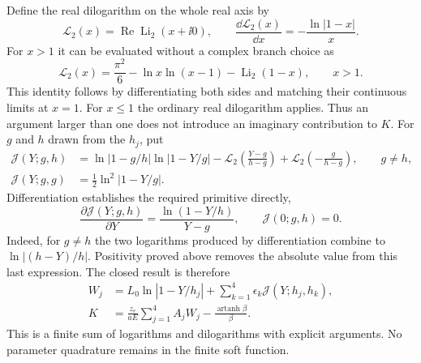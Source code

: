 Define the real dilogarithm on the whole real axis by
\begin{equation}
 \mathcal L_2(x)=\operatorname{Re}\operatorname{Li}_2(x+\ii0),
 \qquad
 \frac{\dd\mathcal L_2(x)}{\dd x}=-\frac{\ln|1-x|}{x}.
\end{equation}
For $x>1$ it can be evaluated without a complex branch choice as
\begin{equation}
 \mathcal L_2(x)=\frac{\pi^2}{6}-\ln x\ln(x-1)
 -\operatorname{Li}_2(1-x),\qquad x>1.
\end{equation}
This identity follows by differentiating both sides and matching their
continuous limits at $x=1$. For $x\leq1$ the ordinary real dilogarithm
applies. Thus an argument larger than one does not introduce an imaginary
contribution to $K$. For $g$ and $h$ drawn from the $h_j$, put
\begin{align}
 \mathcal J(Y;g,h)
 &=\ln|1-g/h|\ln|1-Y/g|
 -\mathcal L_2\!\left(\frac{Y-g}{h-g}\right)
 +\mathcal L_2\!\left(-\frac{g}{h-g}\right),
 \qquad g\ne h,\\
 \mathcal J(Y;g,g)&=\frac12\ln^2|1-Y/g|.
\end{align}
Differentiation establishes the required primitive directly,
\begin{equation}
 \frac{\partial\mathcal J(Y;g,h)}{\partial Y}
 =\frac{\ln(1-Y/h)}{Y-g},\qquad \mathcal J(0;g,h)=0.
\end{equation}
Indeed, for $g\ne h$ the two logarithms produced by differentiation
combine to $\ln|(h-Y)/h|$. Positivity proved above removes the absolute
value from this last expression. The closed result is therefore
\begin{align}
 W_j&=L_0\ln|1-Y/h_j|
 +\sum_{k=1}^4\epsilon_k\mathcal J(Y;h_j,h_k),\\
 K&=\boxed{\frac{z_e}{aE}\sum_{j=1}^4 A_jW_j
 -\frac{\operatorname{artanh}\beta}{\beta}.}
 \label{eq:comp-soft-K-dilog}
\end{align}
This is a finite sum of logarithms and dilogarithms with explicit
arguments. No parameter quadrature remains in the finite soft function.

